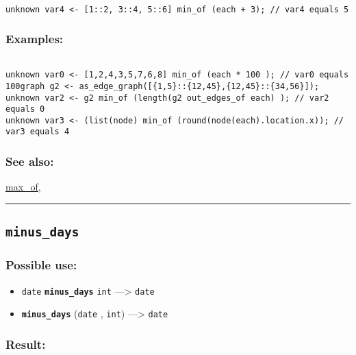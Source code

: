 \documentclass[]{book}
\providecommand{\tightlist}{%
  \setlength{\itemsep}{0pt}\setlength{\parskip}{0pt}}
\theoremstyle{definition}
\theoremstyle{definition}
\theoremstyle{definition}
\theoremstyle{remark}
\begin{document}
\begin{verbatim}
 
unknown var4 <- [1::2, 3::4, 5::6] min_of (each + 3); // var4 equals 5
\end{verbatim}

\subsubsection{Examples:}\label{examples-242}

\begin{verbatim}
 
unknown var0 <- [1,2,4,3,5,7,6,8] min_of (each * 100 ); // var0 equals 100graph g2 <- as_edge_graph([{1,5}::{12,45},{12,45}::{34,56}]);  
unknown var2 <- g2 min_of (length(g2 out_edges_of each) ); // var2 equals 0 
unknown var3 <- (list(node) min_of (round(node(each).location.x)); // var3 equals 4
\end{verbatim}

\subsubsection{See also:}\label{see-also-142}

\href{OperatorsIM\#max_of}{max\_of},

\begin{center}\rule{0.5\linewidth}{\linethickness}\end{center}

\subsection{\texorpdfstring{\texttt{minus\_days}}{minus\_days}}\label{minus_days}

\subsubsection{Possible use:}\label{possible-use-353}

\begin{itemize}
\tightlist
\item
  \texttt{date} \textbf{\texttt{minus\_days}} \texttt{int}
  ---\textgreater{} \texttt{date}
\item
  \textbf{\texttt{minus\_days}} (\texttt{date} , \texttt{int})
  ---\textgreater{} \texttt{date}
\end{itemize}

\subsubsection{Result:}\label{result-342}
\end{document}

